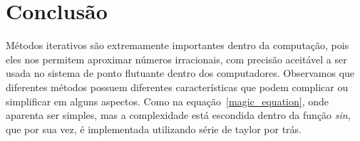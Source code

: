 \section{Conclusão}
\label{sec:conclusao}

	Métodos iterativos são extremamente importantes dentro da computação, pois eles
	nos permitem aproximar números irracionais, com precisão aceitável a ser usada
	no sistema de ponto flutuante dentro dos computadores. Observamos que diferentes
	métodos possuem diferentes características que podem complicar ou simplificar em
	alguns aspectos. Como na equação~\ref{magic_equation}, onde aparenta ser
	simples, mas a complexidade está escondida dentro da função \emph{sin}, que por
	sua vez, é implementada utilizando série de taylor por trás.
